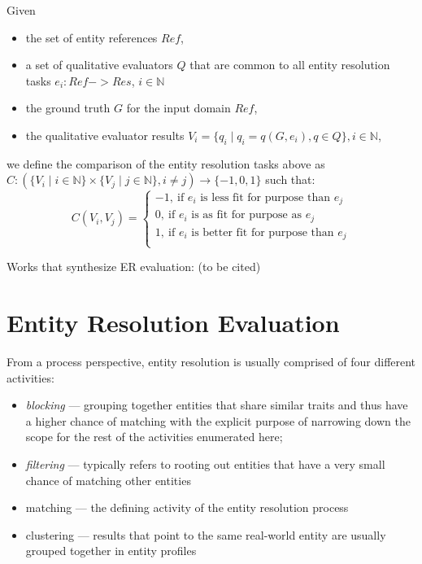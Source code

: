 \documentclass[11pt]{article}
\begin{document}
    \begin{defn}
        Given
        \begin{itemize}
            \item the set of entity references $Ref$,
            \item a set of qualitative evaluators $Q$ that are common to all
            entity resolution tasks $e_i : Ref -> Res$, $i \in \mathbb{N}$
            \item the ground truth $G$ for the input domain $Ref$,
            \item the qualitative evaluator results $V_i=\{q_{i} \mid q_{i} = q(G, e_i), q \in Q\},
            i \in \mathbb{N}$,
        \end{itemize}   
        we define the comparison of the entity resolution tasks above as
        $C : (
            \{V_i \mid i \in \mathbb{N}\}
            \times
            \{V_j \mid j \in \mathbb{N}\},
            i \neq j
        ) \rightarrow \{-1, 0, 1\}$ such that:
        \[ 
C(V_i, V_j) = \left\{
\begin{array}{ll}
      -1,~\textrm{if $e_i$ is less fit for purpose than $e_j$}\\
      0,~\textrm{if $e_i$ is as fit for purpose as $e_j$}\\
      1,~\textrm{if $e_i$ is better fit for purpose than $e_j$}\\
\end{array} 
\right. 
\]

    \end{defn}
    
    Works that synthesize ER evaluation: (to be cited)

    \section[ere]{Entity Resolution Evaluation}\label{sec:ere}

    From a process perspective, entity resolution is usually comprised of four
    different activities\cite{Pap19,Tal11}:
    \begin{itemize}
        \item \textit{blocking} --- grouping together entities that share
        similar traits and thus have a higher chance of matching with the
        explicit purpose of narrowing down the scope for the rest of the
        activities enumerated here;
        \item \textit{filtering} --- typically refers to rooting out entities
        that have a very small chance of matching other entities
        \item matching --- the defining activity of the entity resolution
        process
        \item clustering --- results that point to the same real-world entity
        are usually grouped together in entity profiles
    \end{itemize}
\end{document}
